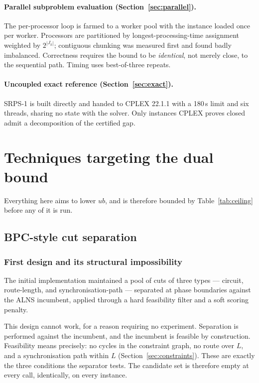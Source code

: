 \documentclass[11pt,a4paper]{article}
\begin{document}
\paragraph{Parallel subproblem evaluation (Section~\ref{sec:parallel}).}
The per-processor loop is farmed to a worker pool with the instance loaded once
per worker. Processors are partitioned by longest-processing-time assignment
weighted by $2^{|J_k|}$; contiguous chunking was measured first and found badly
imbalanced. Correctness requires the bound to be \emph{identical}, not merely
close, to the sequential path. Timing uses best-of-three repeats.

\paragraph{Uncoupled exact reference (Section~\ref{sec:exact}).}
SRPS-1 is built directly and handed to CPLEX 22.1.1 with a 180\,s limit and six
threads, sharing no state with the solver. Only instances CPLEX proves closed
admit a decomposition of the certified gap.

\section{Techniques targeting the dual bound}\label{sec:dual}

Everything here aims to lower $ub$, and is therefore bounded by
Table~\ref{tab:ceiling} before any of it is run.

\subsection{BPC-style cut separation}\label{sec:cuts}

\subsubsection{First design and its structural impossibility}\label{sec:cuts-structural}

The initial implementation maintained a pool of cuts of three types --- circuit,
route-length, and synchronisation-path --- separated at phase boundaries against
the ALNS incumbent, applied through a hard feasibility filter and a soft scoring
penalty.

This design cannot work, for a reason requiring no experiment. Separation is
performed against the incumbent, and the incumbent is feasible by construction.
Feasibility means precisely: no cycles in the constraint graph, no route over $L$,
and a synchronisation path within $L$ (Section~\ref{sec:constraints}). These are
exactly the three conditions the separator tests. The candidate set is therefore
empty at every call, identically, on every instance.
\end{document}
